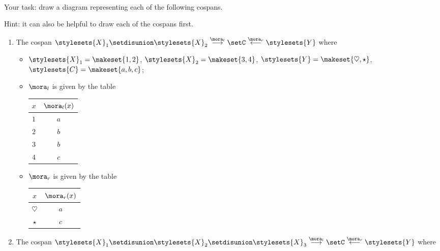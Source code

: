 \begin{gradedexercise}
    \

    Your task: draw a diagram representing each of the following cospans.

    Hint: it can also be helpful to draw each of the cospans first.

    \begin{enumerate}
        \item The cospan $\stylesets{X}_1 \setdisunion \stylesets{X}_2 \overset{\mora_l}{\longrightarrow} \setC \overset{\mora_r}{\longleftarrow}  \stylesets{Y}$ where
              \begin{itemize}
                  \item $\stylesets{X}_1 = \makeset{1, 2}$, $\stylesets{X}_2 = \makeset{3, 4}$, $\stylesets{Y} = \makeset{\heartsuit, \star}$, $\stylesets{C} = \makeset{a, b, c}$;
                  \item $\mora_l$ is given by the table
                        \begin{center}
                            \begin{tabular}{c|c}
                                $x$ & $\mora_l(x)$ \\
                                \hline
                                $1$ & $a$ \\
                                $2$ & $b$ \\
                                $3$ & $b$ \\
                                $4$ & $c$
                            \end{tabular}
                        \end{center}
                  \item $\mora_r$ is given by the table
                        \begin{center}
                            \begin{tabular}{c|c}
                                $x$          & $\mora_r(x)$ \\
                                \hline
                                $\heartsuit$ & $a$ \\
                                $\star$      & $c$
                            \end{tabular}
                        \end{center}
              \end{itemize}
        \item The cospan $\stylesets{X}_1 \setdisunion \stylesets{X}_2 \setdisunion \stylesets{X}_3 \overset{\mora_l}{\longrightarrow} \setC \overset{\mora_r}{\longleftarrow} \stylesets{Y}$ where

\end{enumerate}
\end{gradedexercise}
